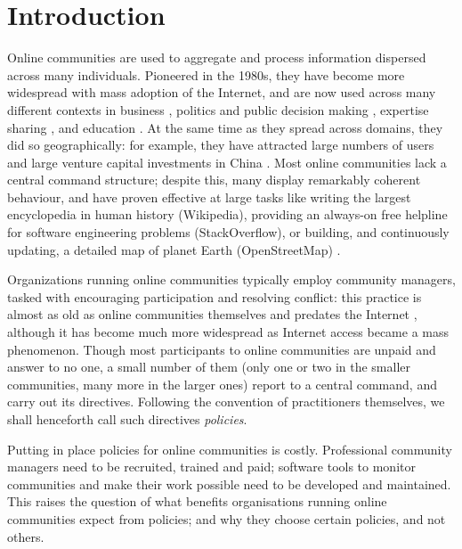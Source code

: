\section{Introduction}

Online communities are used to aggregate and process information dispersed across many individuals. Pioneered in the 1980s, they have become more widespread with mass adoption of the Internet, and are now used across many different contexts in business \cite{mcwilliam2012building, tapscott2008wikinomics}, politics and public decision making \cite{rheingold1993virtual, noveck2009wiki, cottica2010wikicrazia}, expertise sharing \cite{rheingold1993virtual, zhang2007expertise, shirky2008here}, and education \cite{milligan2013patterns}. At the same time as they spread across domains, they did so geographically: for example, they have attracted large numbers of users and large venture capital investments in China \cite{zhou2011social}. Most online communities lack a central command structure; despite this, many display remarkably coherent behaviour, and have proven effective at large tasks like writing the largest encyclopedia in human history (Wikipedia), providing an always-on free helpline for software engineering problems (StackOverflow), or building, and continuously updating, a detailed map of planet Earth (OpenStreetMap) \cite{shirky2008here}. 

Organizations running online communities typically employ community managers, tasked with encouraging participation and resolving conflict: this practice is almost as old as online communities themselves and predates the Internet \cite{rheingold1993virtual}, although it has become much more widespread as Internet access became a mass phenomenon. Though most participants to online communities are unpaid and answer to no one, a small number of them (only one or two in the smaller communities, many more in the larger ones) report to a central command, and carry out its directives. Following the convention of practitioners themselves, we shall henceforth call such directives \emph{policies}. 

Putting in place policies for online communities is costly. Professional community managers need to be recruited, trained and paid; software tools to monitor communities and make their work possible need to be developed and maintained. This raises the question of what benefits organisations running online communities expect from policies; and why they choose certain policies, and not others. 

